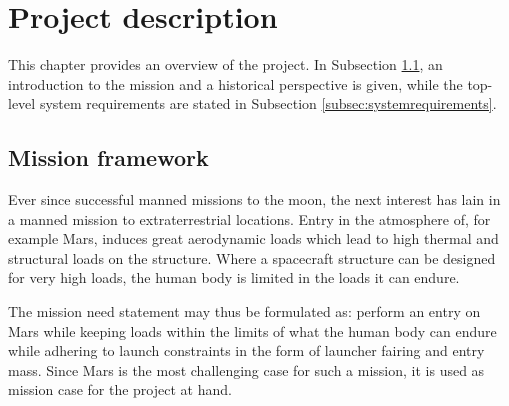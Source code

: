 \section{Project description}\label{cha:project_description}%
This chapter provides an overview of the project. In Subsection \ref{subsec:missionframework}, an introduction to the mission and a historical perspective is given, while the top-level system requirements are stated in Subsection \ref{subsec:systemrequirements}.

\subsection{Mission framework} 
\label{subsec:missionframework}
Ever since successful manned missions to the moon, the next interest has lain in a manned mission to extraterrestrial locations. Entry in the atmosphere of, for example Mars, induces great aerodynamic loads which lead to high thermal and structural loads on the structure. Where a spacecraft structure can be designed for very high loads, the human body is limited in the loads it can endure. 

The mission need statement may thus be formulated as: perform an entry on Mars while keeping loads within the limits of what the human body can endure while adhering to launch constraints in the form of launcher fairing and entry mass. Since Mars is the most challenging case for such a mission, it is used as mission case for the project at hand.

